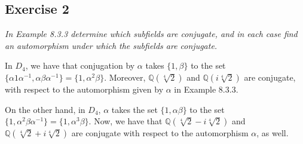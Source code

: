 \subsection*{Exercise 2}
\textit{In Example 8.3.3 determine which subfields are conjugate, and in each case find an automorphism under which the subfields are conjugate.}

In $D_4$, we have that conjugation by $\alpha$ takes $\{1,\beta\}$ to the set $\{\alpha 1 \alpha^{-1}, \alpha\beta\alpha^{-1}\} = \{1,\alpha^2\beta\}$. Moreover, $\mathbb{Q}(\sqrt[4]{2})$ and $\mathbb{Q}(i\sqrt[4]{2})$ are conjugate, with respect to the automorphism given by $\alpha$ in Example 8.3.3.

On the other hand, in $D_4$, $\alpha$ takes the set $\{1,\alpha\beta\}$ to the set $\{1, \alpha^2\beta\alpha^{-1}\} = \{1,\alpha^3\beta\}$. Now, we have that $\mathbb{Q}(\sqrt[4]{2} - i\sqrt[4]{2})$ and $\mathbb{Q}(\sqrt[4]{2} + i\sqrt[4]{2})$ are conjugate with respect to the automorphism $\alpha$, as well.